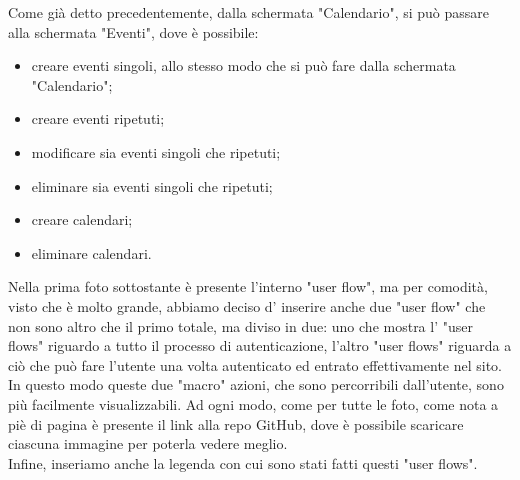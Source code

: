 Come già detto precedentemente, dalla schermata "Calendario", si può passare alla schermata "Eventi", dove è possibile:
\begin{itemize}
    \item creare eventi singoli, allo stesso modo che si può fare dalla schermata "Calendario";
    \item creare eventi ripetuti;
    \item modificare sia eventi singoli che ripetuti;
    \item eliminare sia eventi singoli che ripetuti;
    \item creare calendari;
    \item eliminare calendari.
\end{itemize}
Nella prima foto sottostante è presente l'interno "user flow", ma per comodità, visto che è molto grande, abbiamo deciso d' inserire anche due "user flow" che non sono altro che il primo totale, ma diviso in due: uno che mostra l' "user flows" riguardo a tutto il processo di autenticazione, l'altro "user flows" riguarda a ciò che può fare l'utente una volta autenticato ed entrato effettivamente nel sito. In questo modo queste due "macro" azioni, che sono percorribili dall'utente, sono più facilmente visualizzabili. Ad ogni modo, come per tutte le foto, come nota a piè di pagina è presente il link alla repo GitHub, dove è possibile scaricare ciascuna immagine per poterla vedere meglio. \\
Infine, inseriamo anche la legenda con cui sono stati fatti questi "user flows".

\begin{center}
    
\end{center}

\begin{center}
    
\end{center}

